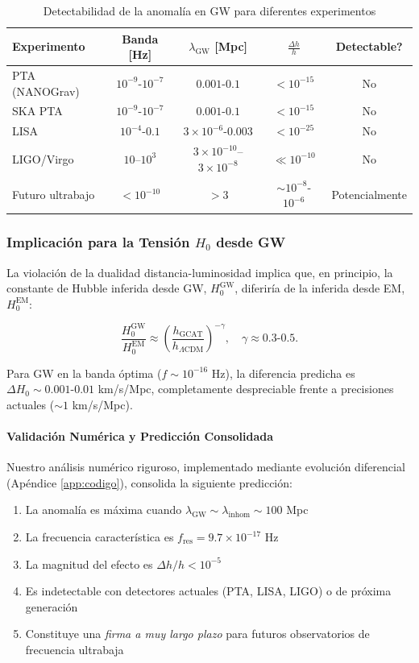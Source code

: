 \documentclass[12pt, a4paper]{article}
\theoremstyle{plain}
\theoremstyle{definition}
\begin{document}
\begin{table}[h]
\centering
\caption{Detectabilidad de la anomalía en GW para diferentes experimentos}
\label{tab:gw_detectability}
\begin{tabular}{lcccc}
\toprule
\textbf{Experimento} & \textbf{Banda [Hz]} & $\lambda_{\mathrm{GW}}$ [Mpc] & $\frac{\Delta h}{h}$ & \textbf{Detectable?} \\
\midrule
PTA (NANOGrav) & $10^{-9}$-$10^{-7}$ & $0.001$-$0.1$ & $< 10^{-15}$ & No \\
SKA PTA & $10^{-9}$-$10^{-7}$ & $0.001$-$0.1$ & $< 10^{-15}$ & No \\
LISA & $10^{-4}$-$0.1$ & $3\times10^{-6}$-$0.003$ & $< 10^{-25}$ & No \\
LIGO/Virgo & $10$--$10^3$ & $3\times10^{-10}$--$3\times10^{-8}$ & $\ll 10^{-10}$ & No \\
Futuro ultrabajo & $< 10^{-10}$ & $> 3$ & $\sim 10^{-8}$-$10^{-6}$ & Potencialmente \\
\bottomrule
\end{tabular}
\end{table}

\subsubsection{Implicación para la Tensión $H_0$ desde GW}

La violación de la dualidad distancia-luminosidad implica que, en principio, la constante de Hubble inferida desde GW, $H_0^{\mathrm{GW}}$, diferiría de la inferida desde EM, $H_0^{\mathrm{EM}}$:

\begin{equation}
\frac{H_0^{\mathrm{GW}}}{H_0^{\mathrm{EM}}} \approx \left(\frac{h_{\mathrm{GCAT}}}{h_{\Lambda\mathrm{CDM}}}\right)^{-\gamma},
\quad \gamma \approx 0.3\text{-}0.5.
\end{equation}

Para GW en la banda óptima ($f \sim 10^{-16}$ Hz), la diferencia predicha es $\Delta H_0 \sim 0.001$-$0.01$ km/s/Mpc, completamente despreciable frente a precisiones actuales ($\sim 1$ km/s/Mpc).

\paragraph{Validación Numérica y Predicción Consolidada}
Nuestro análisis numérico riguroso, implementado mediante evolución diferencial (Apéndice \ref{app:codigo}), consolida la siguiente predicción:
\begin{enumerate}
    \item La anomalía es máxima cuando $\lambda_{\mathrm{GW}} \sim \lambda_{\mathrm{inhom}} \sim 100$ Mpc
    \item La frecuencia característica es $f_{\mathrm{res}} = 9.7 \times 10^{-17}$ Hz
    \item La magnitud del efecto es $\Delta h/h < 10^{-5}$
    \item Es indetectable con detectores actuales (PTA, LISA, LIGO) o de próxima generación
    \item Constituye una \textit{firma a muy largo plazo} para futuros observatorios de frecuencia ultrabaja
\end{enumerate}
\end{document}
